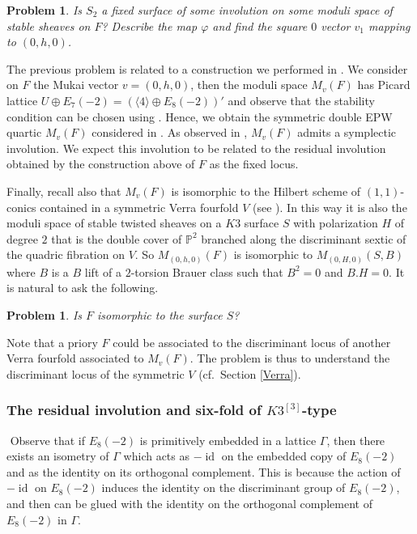 \documentclass{amsart}
\newtheorem{prob}[thm]{Problem}
\theoremstyle{definition}
\numberwithin{equation}{section}
\numberwithin{equation}{section} \theoremstyle{definition}
\DeclareMathOperator{\id}{id}
\newcommand\PP{{\mathbb{P}}}
\begin{document}
\begin{prob}\label{prob14.0}
    Is $S_2$ a fixed surface  of some involution on some moduli space of stable sheaves on $F$?
    Describe the map $\varphi$ and find the square $0$ vector $v_1$ mapping to $(0,h,0)$.
    \end{prob}
The previous problem is related to a construction we performed in \cite{CGKK}.
We consider on $F$ the Mukai vector $v=(0,h,0)$, then the moduli space $M_v(F)$ has Picard lattice $U\oplus E_7(-2)=(\langle 4\rangle\oplus E_8(-2))'$ and observe that the stability condition can be chosen using \cite[Theorem 1.3]{BM}.
Hence, we obtain the symmetric double EPW quartic $M_v(F)$ considered in 
\cite[Section 5]{CGKK}.
As observed in \cite[Section 5.1]{CGKK}, $M_v(F)$ admits a symplectic involution. We expect  this involution to be related to the residual involution obtained by the construction above of $F$ as the fixed locus.
 
Finally, recall also that $M_v(F)$ is isomorphic to the Hilbert scheme of $(1,1)$-conics contained in a symmetric Verra fourfold $V$ (see \cite[Section 5A]{CGKK}). In this way it
is also the moduli space of stable twisted sheaves on a $K3$ surface $S$ with polarization $H$ of degree $2$ that is the double cover of $\PP^2$ branched along the discriminant sextic of the quadric fibration on $V$.
So $M_{(0,h,0)}(F)$ is isomorphic to $M_{(0,H,0)}(S,B)$ where $B$ is a $B$ lift of a $2$-torsion Brauer class such that  $B^2=0$ and $B.H=0$.
 It is natural to ask the following.
\begin{prob}\label{prob14.1}
   Is $F$ isomorphic to the  surface $S$? 
    \end{prob}
    Note that a priory $F$ could be associated to the discriminant locus of another Verra fourfold associated to $M_v(F)$. The problem is thus to understand the discriminant locus of the symmetric $V$ (cf.~Section \ref{Verra}).


\subsubsection{The residual involution and {six-fold of $K3^{[3]}$-type}}
$ $
Observe that if $E_8(-2)$ is primitively embedded in a lattice $\Gamma$, then there exists an isometry of $\Gamma$ which acts as $-\id$ on the embedded copy of $E_8(-2)$ and as the identity on its orthogonal complement. This is because the action of $-\id$ on $E_8(-2)$ induces the identity on the discriminant group of $E_8(-2)$, and then can be glued with the identity on the orthogonal complement of $E_8(-2)$ in $\Gamma$.
\end{document}
